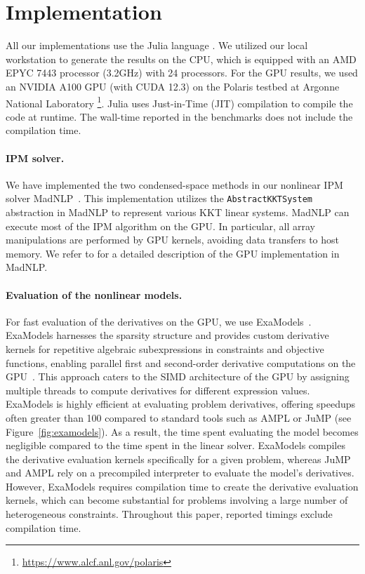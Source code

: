 \documentclass[smallextended]{svjour3}
\newcommand{\add}[1]{#1}
\begin{document}
\section{Implementation}
\label{sec:num:implementation}
All our implementations use the Julia language \cite{bezanson-edelman-karpinski-shah-2017}.
We utilized our local workstation to generate the results on the CPU, which is equipped with an AMD EPYC 7443 processor (3.2GHz) with 24 processors.
For the GPU results, we used an NVIDIA A100 GPU (with CUDA 12.3) on the Polaris testbed at Argonne National Laboratory
\footnote{\url{https://www.alcf.anl.gov/polaris}}.
\add{Julia uses Just-in-Time (JIT) compilation to compile the code at runtime.
  The wall-time reported in the benchmarks does not include the compilation time.
}


\paragraph{IPM solver.}
We have implemented the two condensed-space methods in our nonlinear IPM solver MadNLP~\cite{shin2021graph}.
This implementation utilizes the {\tt AbstractKKTSystem} abstraction
in MadNLP to represent various KKT linear systems.
MadNLP can execute most of the IPM algorithm on the GPU.
In particular, all array manipulations are performed by GPU kernels, avoiding data transfers to host memory.
We refer to \cite{shin2023accelerating} for a detailed description of the GPU implementation in MadNLP.


\paragraph{Evaluation of the nonlinear models.}
For fast evaluation of the derivatives on the GPU,
we use ExaModels~\cite{shin2023accelerating}.
ExaModels harnesses the sparsity structure and provides custom derivative
kernels for repetitive algebraic subexpressions in constraints and
objective functions, enabling parallel first and second-order derivative computations on the GPU~\cite{bischof1991exploiting,enzyme2021}.
This approach caters to the SIMD architecture of the GPU by assigning multiple threads
to compute derivatives for different expression values.
ExaModels is highly efficient at evaluating problem derivatives, offering speedups often greater than 100 compared
to standard tools such as AMPL or JuMP (see Figure~\ref{fig:examodels}). As a
result, the time spent evaluating the model becomes
negligible compared to the time spent in the linear solver.
ExaModels compiles the derivative evaluation kernels specifically for a
given problem, whereas JuMP and AMPL rely on a precompiled interpreter to evaluate the model's derivatives.
However, ExaModels requires compilation time to create the derivative
evaluation kernels, which can become substantial for problems involving a
large number of heterogeneous constraints.
Throughout this paper, reported timings exclude compilation time.
\end{document}
